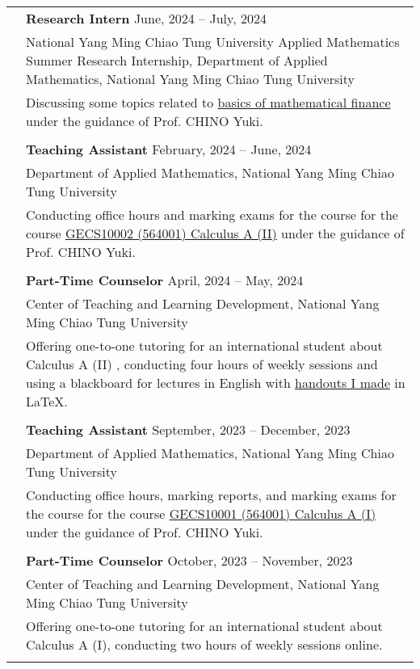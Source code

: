 \documentclass[letterpaper, 11pt]{article}
\begin{document}
\begin{center}
\begin{longtable}{p{0.76in}p{5.93in}}
        & \textbf{Research Intern} \hfill June, 2024 -- July, 2024 \\
        & National Yang Ming Chiao Tung University Applied Mathematics Summer Research Internship, Department of Applied Mathematics, National Yang Ming Chiao Tung University \\
        & Discussing some topics related to \href{https://hackmd.io/@eiken-sc11/B1QcaW3B0}{basics of mathematical finance} under the guidance of Prof. CHINO Yuki.\\
        & \\
        
        & \textbf{Teaching Assistant}  \hfill February, 2024 -- June, 2024 \\
         
        & Department of Applied Mathematics, National Yang Ming Chiao Tung University\\
        & Conducting office hours and marking exams for the course for the course \href{https://reurl.cc/RqoMez}{GECS10002 (564001) Calculus A (II)} under the guidance of Prof. CHINO Yuki. \\
        & \\
        
        & \textbf{Part-Time Counselor} \hfill April, 2024 -- May, 2024 \\
        & Center of Teaching and Learning Development, National Yang Ming Chiao Tung University\\
        & Offering one-to-one tutoring for an international student about Calculus A (II) , conducting four hours of weekly sessions and using a blackboard for lectures in English with \href{https://github.com/eiken59/2024_II_Tutor}{handouts I made} in \LaTeX.\\
        & \\

        & \textbf{Teaching Assistant} \hfill September, 2023 -- December, 2023 \\
        & Department of Applied Mathematics, National Yang Ming Chiao Tung University\\
        & Conducting office hours, marking reports, and marking exams for the course for the course \href{https://reurl.cc/Djp5jN}{GECS10001 (564001) Calculus A (I)} under the guidance of Prof. CHINO Yuki.\\
        & \\

        & \textbf{Part-Time Counselor} \hfill October, 2023 -- November, 2023 \\
        & Center of Teaching and Learning Development, National Yang Ming Chiao Tung University\\
        & Offering one-to-one tutoring for an international student about Calculus A (I), conducting two hours of weekly sessions online.\\
        & \\
        

\end{longtable}
\end{center}
\end{document}
